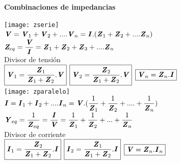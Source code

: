 \documentclass[11pt,a4paper,twocolumn]{article}
\begin{document}
	\textbf{Combinaciones de impedancias}
	\begin{center}
		\texttt{[image: zserie]}\\
		$\textbf{\textit{V}}=\textbf{\textit{V}}_{1} +\textbf{\textit{V}}_{2}+....\textbf{\textit{V}}_{n} =\textbf{\textit{I}}.(\textbf{\textit{Z}}_{1} +\textbf{\textit{Z}}_{2}+....\textbf{\textit{Z}}_{n}) $\\
		\vspace{0.1cm}		
		$\textit{\textbf{Z}}_{eq}=\dfrac{\textbf{\textit{V}}}{\textbf{\textit{I}}}=\textbf{\textit{Z}}_{1} +\textbf{\textit{Z}}_{2} +\textbf{\textit{Z}}_{3} +....\textbf{\textit{Z}}_{n}$\\
		\vspace{0.1cm}	
		Divisor de tensión\\
		$\boxed{\textbf{\textit{V}}_{1}=\dfrac{\textbf{\textit{Z}}_{1}}{\textbf{\textit{Z}}_{1}+\textbf{\textit{Z}}_{2} } . \textbf{\textit{V}}}$		$\boxed{\textbf{\textit{V}}_{2}=\dfrac{\textbf{\textit{Z}}_{2}}{\textbf{\textit{Z}}_{1}+\textbf{\textit{Z}}_{2} } . \textbf{\textit{V}}}$
		$\boxed{\textbf{\textit{V}}_{n}=\textbf{\textit{Z}}_{n}.\textbf{\textit{I}}}$\\

		\vspace{0.6cm}
		\texttt{[image: zparalelo]}\\	
		$\textbf{\textit{I}}=\textbf{\textit{I}}_{1} +\textbf{\textit{I}}_{2}+....\textbf{\textit{I}}_{n} =\textbf{\textit{V}}.(\dfrac{1}{\textbf{\textit{Z}}_{1}} +\dfrac{1}{\textbf{\textit{Z}}_{2}}+....+\dfrac{1}{\textbf{\textit{Z}}_{n}} ) $\\
		\vspace{0.1cm}
		$\textbf{\textit{Y}}_{eq}=\dfrac{1}{\textbf{\textit{Z}}_{eq}}=\dfrac{\textbf{\textit{I}}}{\textbf{\textit{V}}}=\dfrac{1}{\textbf{\textit{Z}}_{1}} +\dfrac{1}{\textbf{\textit{Z}}_{2}}+...+\dfrac{1}{\textbf{\textit{Z}}_{n}}$\\
				\vspace{0.1cm}	
		Divisor de corriente\\
		$\boxed{\textbf{\textit{I}}_{1}=\dfrac{\textbf{\textit{Z}}_{2}}{\textbf{\textit{Z}}_{1}+\textbf{\textit{Z}}_{2} } . \textbf{\textit{I}}}$		$\boxed{\textbf{\textit{I}}_{2}=\dfrac{\textbf{\textit{Z}}_{1}}{\textbf{\textit{Z}}_{1}+\textbf{\textit{Z}}_{2} } . \textbf{\textit{I}}}$
		$\boxed{\textbf{\textit{V}}=\textbf{\textit{Z}}_{n}.\textbf{\textit{I}}_{n}}$\\
	\end{center}
\end{document}
